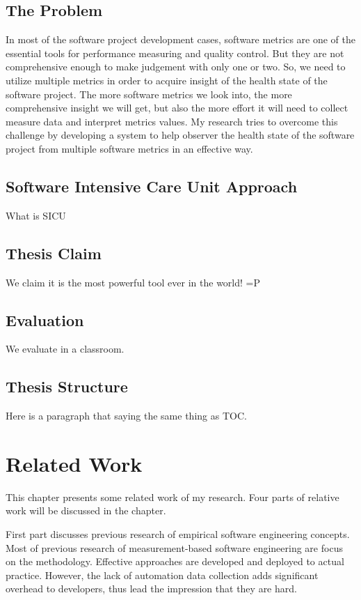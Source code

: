 \section{The Problem}
In most of the software project development cases, software metrics are one of the essential tools for performance measuring and quality control. But they are not comprehensive enough to make judgement with only one or two. So, we need to utilize multiple metrics in order to acquire insight of the health state of the software project. The more software metrics we look into, the more comprehensive insight we will get, but also the more effort it will need to collect measure data and interpret metrics values. My research tries to overcome this challenge by developing a system to help observer the health state of the software project from multiple software metrics in an effective way.

\section{Software Intensive Care Unit Approach}
What is SICU

\section{Thesis Claim}
We claim it is the most powerful tool ever in the world! =P

\section{Evaluation}
We evaluate in a classroom.

\section{Thesis Structure}
Here is a paragraph that saying the same thing as TOC.

\chapter{Related Work}
This chapter presents some related work of my research. Four parts of relative work will be discussed in the chapter.

First part discusses previous research of empirical software engineering concepts. Most of previous research of measurement-based software engineering are focus on the methodology. Effective approaches are developed and deployed to actual practice. However, the lack of automation data collection adds significant overhead to developers, thus lead the impression that they are hard. 

